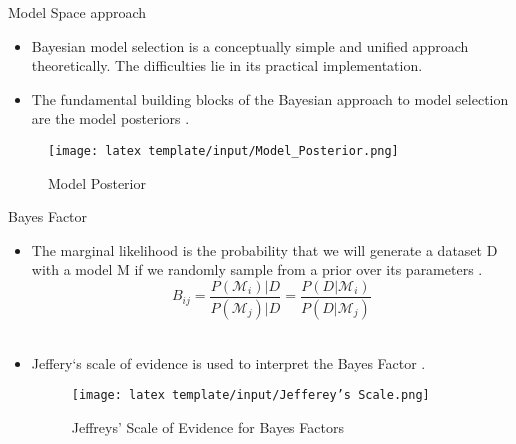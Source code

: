 \documentclass[t, aspectratio=169]{beamer}
\begin{document}

 \begin{frame}{Model Space approach}
 \vspace{0.7cm}
 \begin{itemize}
  \item Bayesian model selection is a conceptually simple and unified approach theoretically. The difficulties lie in its practical implementation.
  \item The fundamental building blocks of the Bayesian approach to model selection are the model posteriors \cite{Wasserman}.
\end{itemize}
 \vspace{0.6cm}
 \begin{figure}
 \texttt{[image: latex template/input/Model\_Posterior.png]}
 \caption{Model Posterior}
 \end{figure}
 \end{frame} 
 

 
 
 
 \begin{frame}{Bayes Factor}
 \vspace{0.2cm}
 \begin{itemize}
  \item The marginal likelihood is the probability that we will generate a dataset D with a model M if we randomly sample from a prior over its parameters \cite{Wasserman}.
\\
  \[B_{ij} = \frac{P(\mathcal{M}_i)|D}{P(\mathcal{M}_j)|D} = \frac{P(D|\mathcal{M}_i)}{P(D|\mathcal{M}_j)}\]\\
  \vspace{0.3cm}
  \item Jeffery‘s scale of evidence is used to interpret the Bayes Factor \cite{Wasserman}.
   \begin{figure}
 \texttt{[image: latex template/input/Jefferey's Scale.png]}
 \caption{Jeffreys' Scale of Evidence for Bayes Factors \cite{Wasserman}}
 \end{figure}
\end{itemize}
 \end{frame}  
 
\end{document}
